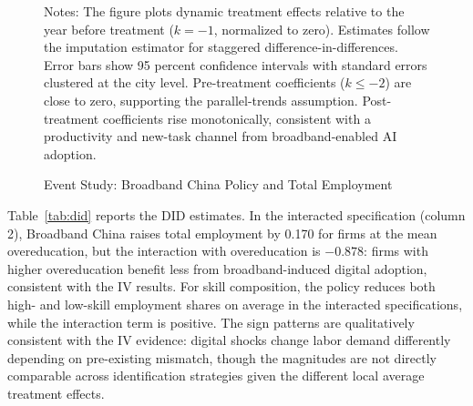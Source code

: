 \documentclass[12pt,a4paper]{article}
\theoremstyle{predstyle}
\theoremstyle{plain}
\begin{document}
\begin{figure}[H]
\centering
{}
\caption{Event Study: Broadband China Policy and Total Employment}
\label{fig:event}
\begin{minipage}{0.86\textwidth}
\footnotesize
Notes: The figure plots dynamic treatment effects relative to the year before treatment ($k=-1$, normalized to zero). Estimates follow the \citet{borusyak2024revisiting} imputation estimator for staggered difference-in-differences. Error bars show 95 percent confidence intervals with standard errors clustered at the city level. Pre-treatment coefficients ($k \leq -2$) are close to zero, supporting the parallel-trends assumption. Post-treatment coefficients rise monotonically, consistent with a productivity and new-task channel from broadband-enabled AI adoption.
\end{minipage}
\end{figure}

Table~\ref{tab:did} reports the DID estimates. In the interacted specification (column 2), Broadband China raises total employment by 0.170 for firms at the mean overeducation, but the interaction with overeducation is \(-0.878\): firms with higher overeducation benefit less from broadband-induced digital adoption, consistent with the IV results. For skill composition, the policy reduces both high- and low-skill employment shares on average in the interacted specifications, while the interaction term is positive. The sign patterns are qualitatively consistent with the IV evidence: digital shocks change labor demand differently depending on pre-existing mismatch, though the magnitudes are not directly comparable across identification strategies given the different local average treatment effects.
\end{document}
